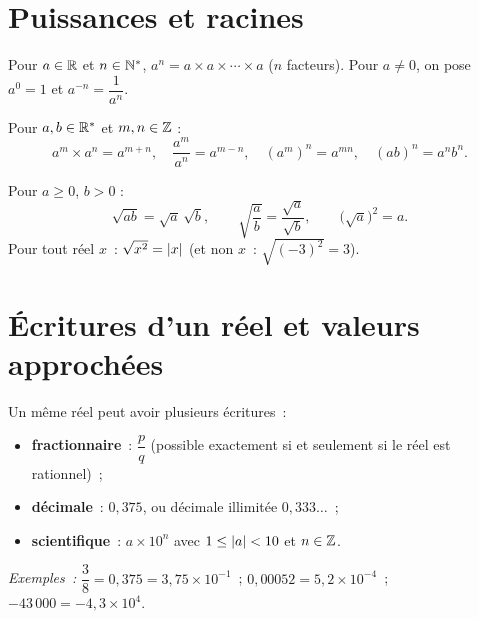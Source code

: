 \section{Puissances et racines}

\begin{defn}
Pour $a\in\mathbb{R}$ et $n\in\mathbb{N}^*$, $a^n=a\times a\times\cdots\times a$ ($n$ facteurs).
Pour $a\ne0$, on pose $a^0=1$ et $a^{-n}=\dfrac{1}{a^n}$.
\end{defn}

\begin{prop}
Pour $a, b \in \mathbb{R}^*$ et $m, n \in \mathbb{Z}$ :
$$a^m \times a^n = a^{m+n},\quad \frac{a^m}{a^n} = a^{m-n},\quad
  (a^m)^n = a^{mn},\quad (ab)^n = a^n b^n.$$
\end{prop}

\begin{prop}
Pour $a \geq 0$, $b > 0$ :
$$\sqrt{ab} = \sqrt{a}\,\sqrt{b},\qquad
  \sqrt{\frac{a}{b}} = \frac{\sqrt{a}}{\sqrt{b}},\qquad
  \bigl(\sqrt{a}\bigr)^2 = a.$$
Pour tout r\'eel $x$~: $\sqrt{x^2}=\left|x\right|$ (et non $x$~: $\sqrt{(-3)^2}=3$).
\end{prop}

\section{\'Ecritures d'un r\'eel et valeurs approch\'ees}

\begin{defn}
Un m\^eme r\'eel peut avoir plusieurs \'ecritures~:
\begin{itemize}
  \item \textbf{fractionnaire}~: $\dfrac{p}{q}$ (possible exactement si et seulement si le r\'eel est rationnel)~;
  \item \textbf{d\'ecimale}~: $0{,}375$, ou d\'ecimale illimit\'ee $0{,}333\ldots$~;
  \item \textbf{scientifique}~: $a\times10^{n}$ avec $1\leq\left|a\right|<10$ et $n\in\mathbb{Z}$.
\end{itemize}
\emph{Exemples~:} $\dfrac38=0{,}375=3{,}75\times10^{-1}$~;
$0{,}00052=5{,}2\times10^{-4}$~; $-43\,000=-4{,}3\times10^{4}$.
\end{defn}

